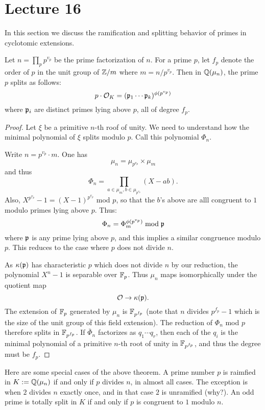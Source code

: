 \section{Lecture 16}

In this section we discuss the ramification and splitting behavior of primes in cyclotomic extensions.

\begin{theorem}
  Let $n = \prod_{p} p^{v_{p}}$ be the prime factorization of $n$.
  For a prime $p$, let $f_{p}$ denote the order of $p$ in the unit group of $\mathbb{Z}/m$ where $m = n/p^{v_{p}}$.
  Then in $\mathbb{Q}(\mu_{n})$, the prime $p$ splits as follows:
  \[ p \cdot \mathcal{O}_{K} = (\mathfrak{p}_{1} \cdots \mathfrak{p}_{k})^{\phi(p^{v_{p}})} \]
  where $\mathfrak{p}_{i}$ are distinct primes lying above $p$, all of degree $f_{p}$.
\end{theorem}
\begin{proof}
  Let $\xi$ be a primitive $n$-th roof of unity.
  We need to understand how the minimal polynomial of $\xi$ splits modulo $p$.
  Call this polynomial $\Phi_{n}$.

  Write $n = p^{v_{p}} \cdot m$.
  One has
  \[ \mu_{n} = \mu_{p^{v_{p}}} \times \mu_{m} \]
  and thus
  \[ \Phi_{n} = \prod_{a \in \mu_{m}, b \in \mu_{p^{v_{p}}}}(X - ab). \]
  Also, $X^{p^{v_{p}}} - 1 = (X-1)^{p^{v_{p}}}$ mod $p$, so that the $b$'s above are alll congruent to $1$ modulo primes lying above $p$.
  Thus:
  \[ \Phi_{n} = \Phi_{m}^{\phi(p^{v_{p}})} \bmod \mathfrak{p} \]
  where $\mathfrak{p}$ is any prime lying above $p$, and this implies a similar congruence modulo $p$.
  This reduces to the case where $p$ does not divide $n$.

  As $\kappa(\mathfrak{p})$ has characteristic $p$ which does not divide $n$ by our reduction, the polynomial $X^{n}-1$ is separable over $\mathbb{F}_{p}$.
  Thus $\mu_{n}$ maps isomorphically under the quotient map
  \[ \mathcal{O} \to \kappa(\mathfrak{p}). \]
  The extension of $\mathbb{F}_{p}$ generated by $\mu_{n}$ is $\mathbb{F}_{p^{f_{p}}}$  (note that $n$ divides $p^{f_{p}}-1$ which is the size of the unit group of this field extension).
  The reduction of $\Phi_{n}$ mod $p$ therefore splits in $\mathbb{F}_{p^{f_{p}}}$.
  If $\bar\Phi_{n}$ factorizes as $q_{1} \cdots q_{r}$, then each of the $q_{i}$ is the minimal polynomial of a primitive $n$-th root of unity in $\mathbb{F}_{p^{f_{p}}}$, and thus the degree must be $f_{p}$.
\end{proof}

Here are some special cases of the above theorem.
A prime number $p$ is raimfied in $K := \mathbb{Q}(\mu_{n})$ if and only if $p$ divides $n$, in almost all cases.
The exception is when $2$ divides $n$ exactly once, and in that case $2$ is unramified (why?).
An odd prime is totally split in $K$ if and only if $p$ is congruent to $1$ modulo $n$.

